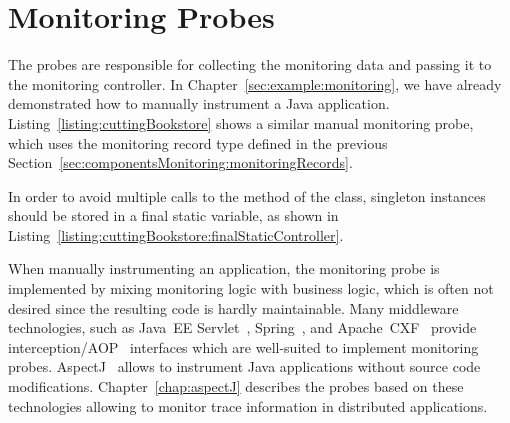 
\section{Monitoring Probes}\label{sec:monitoring:probe}

The probes are responsible for collecting the monitoring data and passing it %
to the monitoring controller. %
In Chapter~\ref{sec:example:monitoring}, we have already demonstrated how to %
manually instrument a Java application. Listing~\ref{listing:cuttingBookstore} %
shows a similar manual monitoring probe, which uses the monitoring record type %
 defined in the previous Section~\ref{sec:componentsMonitoring:monitoringRecords}.



\noindent In order to avoid multiple calls to the  method of the %
 class, singleton instances should be stored %
in a final static variable, as shown in Listing~\ref{listing:cuttingBookstore:finalStaticController}.

\enlargethispage{1cm}



\noindent When manually instrumenting an application, the monitoring probe is implemented %
by mixing monitoring logic with business logic, which is often not desired since %
the resulting code is hardly maintainable. %
Many middleware technologies, such as Java~EE Servlet~\cite{JavaServletTechnology-WebSite}, %
Spring~\cite{Spring-WebSite}, and %
Apache~CXF~\cite{CXF-WebSite} provide interception/AOP~\cite{Kiczales1997} interfaces %
which are well-suited to implement monitoring probes. AspectJ~\cite{AspectJ-WebSite} allows to %
instrument Java applications without source code modifications. %
Chapter~\ref{chap:aspectJ} describes the \Kieker{} probes based on these technologies allowing to %
monitor trace information in distributed applications.

